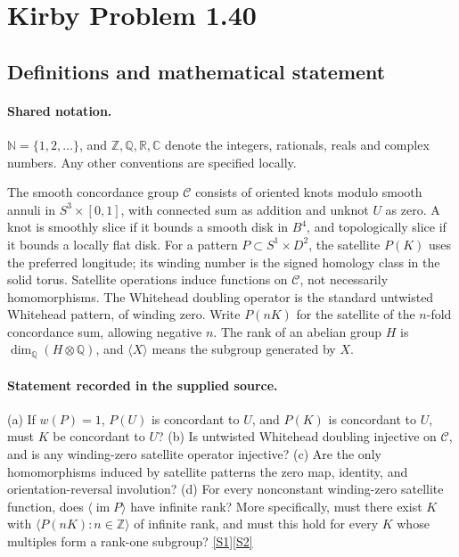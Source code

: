 \documentclass[11pt]{article}
\newcommand{\sref}[2]{\hyperlink{source:#1:#2}{[S#2]}}
\begin{document}
\section{Kirby Problem 1.40}\label{statement}

\subsection{Definitions and mathematical statement}

\paragraph{Shared notation.}$\mathbb N=\{1,2,\ldots\}$, and $\mathbb Z,\mathbb Q,\mathbb R,\mathbb C$ denote the integers, rationals, reals and complex numbers. Any other conventions are specified locally.


The smooth concordance group $\mathcal C$ consists of oriented knots modulo smooth annuli in $S^3\times[0,1]$, with connected sum as addition and unknot $U$ as zero. A knot is smoothly slice if it bounds a smooth disk in $B^4$, and topologically slice if it bounds a locally flat disk. For a pattern $P\subset S^1\times D^2$, the satellite $P(K)$ uses the preferred longitude; its winding number is the signed homology class in the solid torus. Satellite operations induce functions on $\mathcal C$, not necessarily homomorphisms. The Whitehead doubling operator is the standard untwisted Whitehead pattern, of winding zero. Write $P(nK)$ for the satellite of the $n$-fold concordance sum, allowing negative $n$. The rank of an abelian group $H$ is $\dim_{\mathbb Q}(H\otimes\mathbb Q)$, and $\langle X\rangle$ means the subgroup generated by $X$.
\paragraph{Statement recorded in the supplied source.}
(a) If $w(P)=1$, $P(U)$ is concordant to $U$, and $P(K)$ is concordant to $U$, must $K$ be concordant to $U$? (b) Is untwisted Whitehead doubling injective on $\mathcal C$, and is any winding-zero satellite operator injective? (c) Are the only homomorphisms induced by satellite patterns the zero map, identity, and orientation-reversal involution? (d) For every nonconstant winding-zero satellite function, does $\langle\operatorname{im}P\rangle$ have infinite rank? More specifically, must there exist $K$ with $\langle P(nK):n\in\mathbb Z\rangle$ of infinite rank, and must this hold for every $K$ whose multiples form a rank-one subgroup? \sref{statement}{1}\sref{statement}{2}
\end{document}
